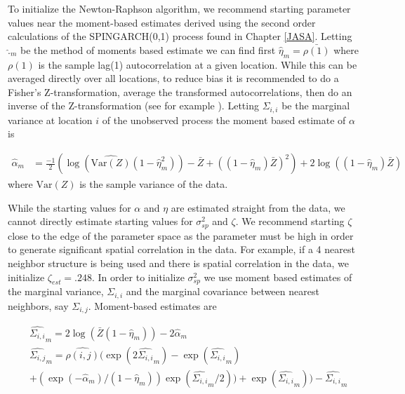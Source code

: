 \documentclass[11pt]{isuthesis}
\begin{document}
	To initialize the Newton-Raphson algorithm, we recommend starting parameter values near the moment-based estimates derived using the second order calculations of the SPINGARCH(0,1) process found in Chapter \ref{JASA}.  Letting $\widehat{.}_m$ be the method of moments based estimate we can find first $\widehat{\eta}_m=\bar{\rho(1)}$ where $\rho(1)$ is the sample lag(1) autocorrelation at a given location.  While this can be averaged directly over all locations, to reduce bias it is recommended to do a Fisher's Z-transformation, average the transformed autocorrelations, then do an inverse of the Z-transformation (see for example \cite{silver1987averaging}).  Letting $\Sigma_{i,i}$ be the marginal variance at location $i$ of the unobserved process the moment based estimate of $\alpha$ is

	\begin{align}
		\widehat{\alpha}_m & = \frac{-1}{2}\left(\log\left(\widehat{\mbox{Var}(Z)}(1-\widehat{\eta}_m^2)\right)-\bar{Z}+((1-\widehat{\eta}_m)\bar{Z})^2\right)+2\log\left((1-\widehat{\eta}_m)\bar{Z}\right)
		 \label{eq:alphamom}
	\end{align}
	 where $\widehat{\mbox{Var}(Z)}$ is the sample variance of the data.
	 
	 While the starting values for $\alpha$ and $\eta$ are estimated straight from the data, we cannot directly estimate starting values for $\sigma_{sp}^2$ and $\zeta$.  We recommend starting $\zeta$ close to the edge of the parameter space as the parameter must be high in order to generate significant spatial correlation in the data.  For example, if a 4 nearest neighbor structure is being used and there is spatial correlation in the data, we initialize $\zeta_{est}=.248$.  In order to initialize $\sigma^2_{sp}$ we use moment based estimates of the marginal variance, $\Sigma_{i,i}$ and the marginal covariance between nearest neighbors, say $\Sigma_{i,j}$.  Moment-based estimates are

	\begin{align}
		& \widehat{\Sigma_{i,i}}_m = 2\log(\bar{Z}(1-\widehat{\eta}_m))-2\widehat{\alpha}_m\\
		& \widehat{\Sigma_{i,j}}_m = \widehat{\rho(i,j)}(\exp(2\widehat{\Sigma_{i,i}}_m)-\exp(\widehat{\Sigma_{i,i}}_m)\nonumber \\
		&+(\exp(-\widehat{\alpha}_m)/(1-\widehat{\eta}_m))\exp(\widehat{\Sigma_{i,i}}_m/2))+\exp(\widehat{\Sigma_{i,i}}_m))-\widehat{\Sigma_{i,i}}_m \label{eq:sigmamom}
	\end{align}
\end{document}
